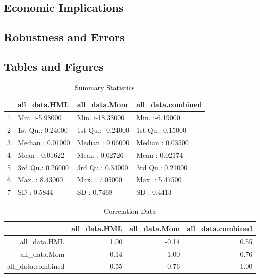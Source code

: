 \documentclass[12pt,letterpaper]{memoir}
\begin{document}
\subsection*{Economic Implications}
\subsection*{Robustness and Errors}
\newpage
\subsection*{Tables and Figures}
\begin{table}[ht]
\centering
\caption{Summary Statistics}
\begin{tabular}{rlll}
  \hline
 &  all\_data.HML &  all\_data.Mom & all\_data.combined \\ 
  \hline
1 & Min.   :-5.98000   & Min.   :-18.33000   & Min.   :-6.19000   \\ 
  2 & 1st Qu.:-0.24000   & 1st Qu.: -0.24000   & 1st Qu.:-0.15000   \\ 
  3 & Median : 0.01000   & Median :  0.06000   & Median : 0.03500   \\ 
  4 & Mean   : 0.01622   & Mean   :  0.02726   & Mean   : 0.02174   \\ 
  5 & 3rd Qu.: 0.26000   & 3rd Qu.:  0.34000   & 3rd Qu.: 0.21000   \\ 
  6 & Max.   : 8.43000   & Max.   :  7.05000   & Max.   : 5.47500   \\
  7 & SD     : 0.5844    & SD     :  0.7468    & SD     : 0.4413     \\
   \hline
\end{tabular}
\end{table}

\begin{table}[ht]
\centering
\caption{Correlation Data}
\begin{tabular}{rrrr}
  \hline
 & all\_data.HML & all\_data.Mom & all\_data.combined \\ 
  \hline
all\_data.HML & 1.00 & -0.14 & 0.55 \\ 
  all\_data.Mom & -0.14 & 1.00 & 0.76 \\ 
  all\_data.combined & 0.55 & 0.76 & 1.00 \\ 
   \hline
\end{tabular}
\end{table}
\end{document}
